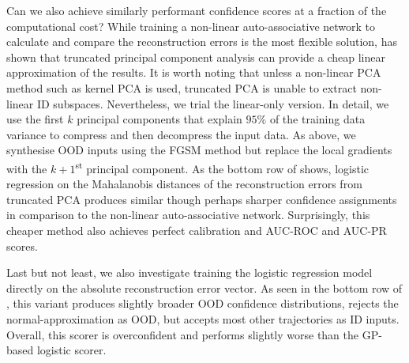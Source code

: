 Can we also achieve similarly performant confidence scores at a fraction of the computational cost? While training a non-linear auto-associative network to calculate and compare the reconstruction errors is the most flexible solution,  has shown that truncated principal component analysis can provide a cheap linear approximation of the results. It is worth noting that unless a non-linear PCA method such as kernel PCA \cite{kernel-pca-1997} is used, truncated PCA is unable to extract non-linear ID subspaces. Nevertheless, we trial the linear-only version. In detail, we use the first $k$ principal components that explain $95\%$ of the training data variance to compress and then decompress the input data. As above, we synthesise OOD inputs using the FGSM method but replace the local gradients with the $k+1$\textsuperscript{st} principal component. As the bottom row of  shows, logistic regression on the Mahalanobis distances of the reconstruction errors from truncated PCA produces similar though perhaps sharper confidence assignments in comparison to the non-linear auto-associative network. Surprisingly, this cheaper method also achieves perfect calibration and AUC-ROC and AUC-PR scores.

\newpar Last but not least, we also investigate training the logistic regression model directly on the absolute reconstruction error vector. As seen in the bottom row of , this variant produces slightly broader OOD confidence distributions, rejects the normal-approximation as OOD, but accepts most other trajectories as ID inputs. Overall, this scorer is overconfident and performs slightly worse than the GP-based logistic scorer.

